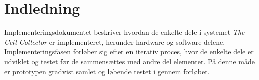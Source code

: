\section{Indledning}
Implementeringsdokumentet beskriver hvordan de enkelte dele i systemet \textit{The Cell Collector} er implementeret, herunder hardware og software delene. Implementeringsfasen forløber sig efter en iterativ proces, hvor de enkelte dele er udviklet og testet før de sammensættes med andre del elementer. På denne måde er prototypen gradvist samlet og løbende testet i gennem forløbet.